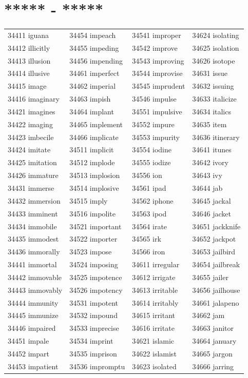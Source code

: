 \documentclass[10pt, oneside]{book}
\begin{document}
\begin{table}[h]
	\centering
	\section*{***** - *****}
	\begin{tabular}{l l l l}
34411 iguana &34454 impeach &34541 improper &34624 isolating\\
34412 illicitly &34455 impeding &34542 improve &34625 isolation\\
34413 illusion &34456 impending &34543 improving &34626 isotope\\
34414 illusive &34461 imperfect &34544 improvise &34631 issue\\
34415 image &34462 imperial &34545 imprudent &34632 issuing\\
34416 imaginary &34463 impish &34546 impulse &34633 italicize\\
34421 imagines &34464 implant &34551 impulsive &34634 italics\\
34422 imaging &34465 implement &34552 impure &34635 item\\
34423 imbecile &34466 implicate &34553 impurity &34636 itinerary\\
34424 imitate &34511 implicit &34554 iodine &34641 itunes\\
34425 imitation &34512 implode &34555 iodize &34642 ivory\\
34426 immature &34513 implosion &34556 ion &34643 ivy\\
34431 immerse &34514 implosive &34561 ipad &34644 jab\\
34432 immersion &34515 imply &34562 iphone &34645 jackal\\
34433 imminent &34516 impolite &34563 ipod &34646 jacket\\
34434 immobile &34521 important &34564 irate &34651 jackknife\\
34435 immodest &34522 importer &34565 irk &34652 jackpot\\
34436 immorally &34523 impose &34566 iron &34653 jailbird\\
34441 immortal &34524 imposing &34611 irregular &34654 jailbreak\\
34442 immovable &34525 impotence &34612 irrigate &34655 jailer\\
34443 immovably &34526 impotency &34613 irritable &34656 jailhouse\\
34444 immunity &34531 impotent &34614 irritably &34661 jalapeno\\
34445 immunize &34532 impound &34615 irritant &34662 jam\\
34446 impaired &34533 imprecise &34616 irritate &34663 janitor\\
34451 impale &34534 imprint &34621 islamic &34664 january\\
34452 impart &34535 imprison &34622 islamist &34665 jargon\\
34453 impatient &34536 impromptu &34623 isolated &34666 jarring\\
	\end{tabular}
 \end{table}
\end{document}
